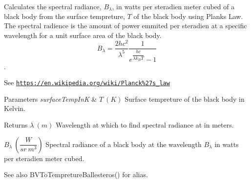 Calculates the spectral radiance, $B_{\lambda}$, in watts per steradien meter cubed of a black body from the surface tempreture, $T$ of the black body using Plank\textquotesingle{}s Law. The spectral radience is the amount of power emmited per steradien at a specific wavelength for a unit surface area of the black body. \[ B_{\lambda} = \dfrac{2 h c^2}{\lambda^5} \dfrac{1}{e^{\dfrac{hc}{\lambda k_B T}} - 1} \]. 

See \href{https://en.wikipedia.org/wiki/Planck%27s_law}{\tt https\+://en.\+wikipedia.\+org/wiki/\+Planck\%27s\+\_\+law}


\begin{DoxyParams}{Parameters}
{\em surface\+Temp\+InK} & $T\ (K)$ Surface tempreture of the black body in Kelvin. \\
\hline
\end{DoxyParams}
\begin{DoxyReturn}{Returns}
$\lambda\ (m)$ Wavelength at which to find spectral radiance at in meters. 

$B_{\lambda}\ ( \dfrac{W}{sr\ m^3})$ Spectral radiance of a black body at the wavelength $B_{\lambda}$ in watts per steradien meter cubed. 
\end{DoxyReturn}
\begin{DoxySeeAlso}{See also}
B\+V\+To\+Tempreture\+Ballesteros() for alias. 
\end{DoxySeeAlso}
